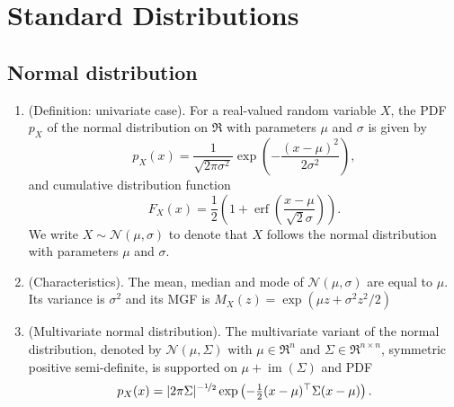\documentclass[a4paper,10pt]{article}
\begin{document}
\section{Standard Distributions}
\subsection{Normal distribution}
\begin{enumerate}
 \item (Definition: univariate case). For a real-valued random variable \(X\), the PDF \(p_X\) of the normal 
       distribution on \(\Re\) with parameters \(\mu\) and \(\sigma\) is given by
 \[
  p_X(x) = \frac{1}{\sqrt{2\pi \sigma^2}}\exp\left(-\frac{(x-\mu)^2}{2\sigma^2}\right),
 \]
 and cumulative distribution function 
 \[
  F_X(x) = \frac{1}{2}\left( 1 + \operatorname{erf}\left(\frac{x-\mu}{\sqrt{2} \sigma}\right) \right).
 \]
 We write \(X\sim \mathcal{N}(\mu, \sigma)\) to denote that \(X\) follows the normal distribution 
 with parameters \(\mu\) and \(\sigma\).

 \item (Characteristics). The mean, median and mode of \(\mathcal{N}(\mu, \sigma)\) are equal to \(\mu\).
       Its variance is \(\sigma^2\) and its MGF is \(M_X(z) = \exp(\mu z + \sigma^2 z^2/2)\)

 \item (Multivariate normal distribution). The multivariate variant of the normal distribution,
       denoted by $\mathcal{N}(\mu, \Sigma)$ with $\mu\in\Re^n$ and $\Sigma\in\Re^{n\times n}$,
       symmetric positive semi-definite, is supported on $\mu + \operatorname{im}(\Sigma)$
       and PDF 
       \[
        p_X(x) = |2\pi \Sigma|^{-\nicefrac{1}{2}}\exp\left(-\tfrac{1}{2}(x-\mu)^{\top}\Sigma(x-\mu)\right).
       \]


\end{enumerate}
\end{document}
